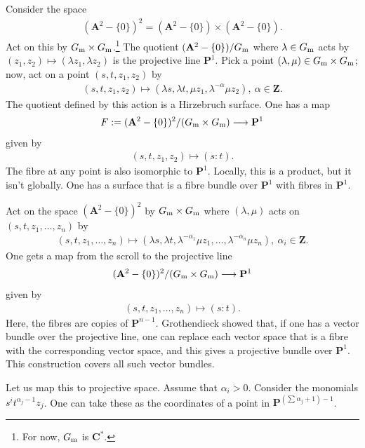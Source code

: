 \documentclass [11 pt, oneside] {article}
\begin{document}
\begin{example}\label{}
Consider the space
\begin{align*}
	(\mathbf{A}^2 - \{0\})^2 = (\mathbf{A}^2 - \{0\}) \times (\mathbf{A}^2 - \{0\}).
\end{align*}
Act on this by $G\textsubscript{m}\times G\textsubscript{m}$.\footnote{For now, $G\textsubscript{m}$ is $\mathbf{C}^*$.} The quotient $(\mathbf{A}^2 - \{0\})/G\textsubscript{m}$ where $\lambda \in G\textsubscript{m}$ acts by $(z_1,z_2)\longmapsto  (\lambda z_1,\lambda z_2)$ is the projective line $\mathbf{P}^1$. Pick a point $(\lambda,\mu)\in  G\textsubscript{m}\times G\textsubscript{m}$; now, act on a point $(s,t,z_1,z_2)$ by
\begin{align*}
	(s,t,z_1,z_2)\longmapsto  (\lambda s, \lambda t,\mu z_1,\lambda^{-\alpha}\mu z_2),\ \alpha\in  \mathbf{Z}.
\end{align*}
The quotient defined by this action is a Hirzebruch surface. One has a map
\begin{align*}
	F := (\mathbf{A}^2-\{0\})^2/({G\textsubscript{m}\times G\textsubscript{m}})\longrightarrow \mathbf{P}^1
\end{align*}
given by
\begin{align*}
	(s,t,z_1,z_2)\longmapsto  (s:t).
\end{align*}
The fibre at any point is also isomorphic to $\mathbf{P}^1$. Locally, this is a product, but it isn't globally. One has a surface that is a fibre bundle over $\mathbf{P}^1$ with fibres in $\mathbf{P}^1$.
\end{example}

\begin{example}[Scrolls]\label{}
Act on the space $(\mathbf{A}^2-\{0\})^2$ by $G\textsubscript{m}\times G\textsubscript{m}$ where $(\lambda,\mu)$ acts on $(s,t,z_1,\hdots, z_n)$ by 
\begin{align*}
	(s,t,z_1,\hdots,z_n)\longmapsto  (\lambda s, \lambda t, \lambda^{-\alpha_1}\mu z_1,\hdots, \lambda^{-\alpha_n}\mu z_n), \ \alpha_i\in \mathbf{Z}.
\end{align*}
One gets a map from the scroll to the projective line
\begin{align*}
	{(\mathbf{A}^2-\{0\})^2}/({G\textsubscript{m}\times G\textsubscript{m}}) \longrightarrow \mathbf{P}^1
\end{align*}
given by
\begin{align*}
	(s,t,z_1,\hdots, z_n) \longmapsto (s:t).
\end{align*}
Here, the fibres are copies of $\mathbf{P}^{n-1}$. Grothendieck showed that, if one has a vector bundle over the projective line,  one can replace each vector space that is a fibre with the corresponding vector space, and this gives a projective bundle over $\mathbf{P}^1$. This construction covers all such vector bundles.

Let us map this to projective space. Assume that $\alpha_i>0$. Consider the monomials $s^it^{\alpha_j-1}z_j$. One can take these as the coordinates of a point in $\mathbf{P}^{\left( \sum_{}^{} \alpha_j+1 \right) - 1}$.
\end{example}
\end{document}
